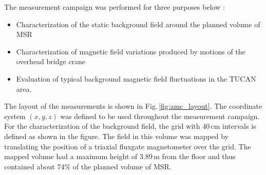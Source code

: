 The measurement campaign was performed for three purposes below :
\begin{itemize}
  \item Characterization of the static background field around the planned volume of MSR
  \item Characterization of magnetic field variations produced by motions of the overhead bridge crane
    \item Evaluation of typical background magnetic field fluctuations in the TUCAN area.
\end{itemize}
The layout of the measurements is shown in Fig.\,\ref{fig:amc_layout}. The coordinate system $(x,y,z)$ was defined to be used throughout the measurement campaign. 
For the characterization of the background field, the grid with 40\,cm intervals is defined as shown in the figure. The field in this volume was mapped by translating the position of a triaxial fluxgate magnetometer over the grid. The mapped volume had a maximum height of 3.89\,m from the floor and thus contained about 74\% of the planned volume of MSR. 

